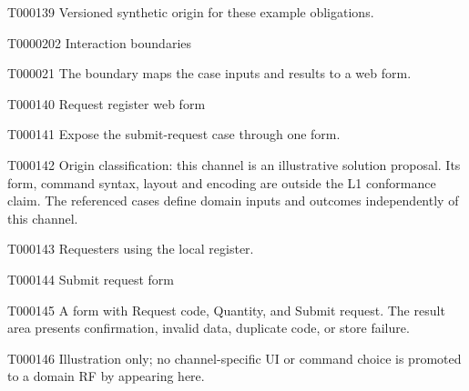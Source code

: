 \documentclass[11pt,a4paper]{article}
\begin{document}
\begin{atlasparagraph}{T000139}
Versioned synthetic origin for these example obligations.
\end{atlasparagraph}
\begin{atlasheading}{T000020}{2}
Interaction boundaries
\end{atlasheading}
\begin{atlasparagraph}{T000021}
The boundary maps the case inputs and results to a web form.
\end{atlasparagraph}
\begin{atlastext}{T000140}
Request register web form
\end{atlastext}
\begin{atlasparagraph}{T000141}
Expose the submit-request case through one form.
\end{atlasparagraph}
\begin{atlasparagraph}{T000142}
Origin classification: this channel is an illustrative solution proposal. Its form, command syntax, layout and encoding are outside the L1 conformance claim. The referenced cases define domain inputs and outcomes independently of this channel.
\end{atlasparagraph}
\begin{atlasparagraph}{T000143}
Requesters using the local register.
\end{atlasparagraph}
\begin{atlastext}{T000144}
Submit request form
\end{atlastext}
\begin{atlasparagraph}{T000145}
A form with Request code, Quantity, and Submit request. The result area presents confirmation, invalid data, duplicate code, or store failure.
\end{atlasparagraph}
\begin{atlasparagraph}{T000146}
Illustration only; no channel-specific UI or command choice is promoted to a domain RF by appearing here.
\end{atlasparagraph}
\end{document}
